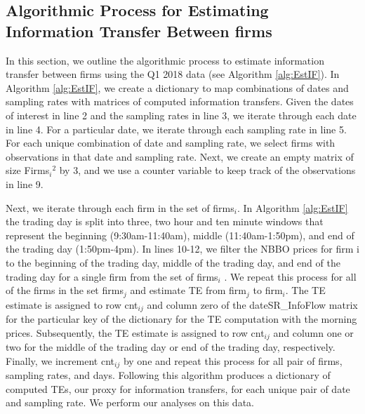 
\subsection{Algorithmic Process for Estimating Information Transfer Between firms}

In this section, we outline the algorithmic process to estimate information transfer between firms using the Q1 2018 data (see Algorithm \ref{alg:EstIF}).  In Algorithm \ref{alg:EstIF},  we create a dictionary to map combinations of dates and sampling rates with matrices of computed information transfers.  Given the dates of interest in line 2 and the sampling rates in line 3, we iterate through each date in line 4.  For a particular date, we iterate through each sampling rate in line 5.  For each unique combination of date and sampling rate, we select firms with observations in that date and sampling rate. Next, we create an empty matrix of size Firms\(_i\)\(^2\) by 3, and we use a counter variable to keep track of the observations in line 9. 

Next, we iterate through each firm in the set of firms\(_i\).  In Algorithm \ref{alg:EstIF} the trading day is split into three,  two hour and ten minute windows that represent the beginning (9:30am-11:40am),  middle (11:40am-1:50pm),  and end of the trading day (1:50pm-4pm).  In lines 10-12, we filter the NBBO prices for firm i to the beginning of the trading day,  middle of the trading day, and end of the trading day for a single firm from the set of firms\(_i\) . We repeat this process for all of the firms in the set firms\(_j\) and estimate TE from firm\(_j\) to firm\(_i\).   The TE estimate is assigned to row cnt\(_{ij}\) and column zero of the dateSR\_InfoFlow matrix for the particular key of the dictionary for the TE computation with the morning prices.  Subsequently, the TE estimate is assigned to row cnt\(_{ij}\) and column one or two for the middle of the trading day or end of the trading day, respectively.   Finally, we increment cnt\(_{ij}\) by one and repeat this process for all pair of firms, sampling rates, and days.  Following this algorithm produces a dictionary of computed TEs, our proxy for information transfers,  for each unique pair of date and sampling rate. We perform our  analyses on this data.  \\

